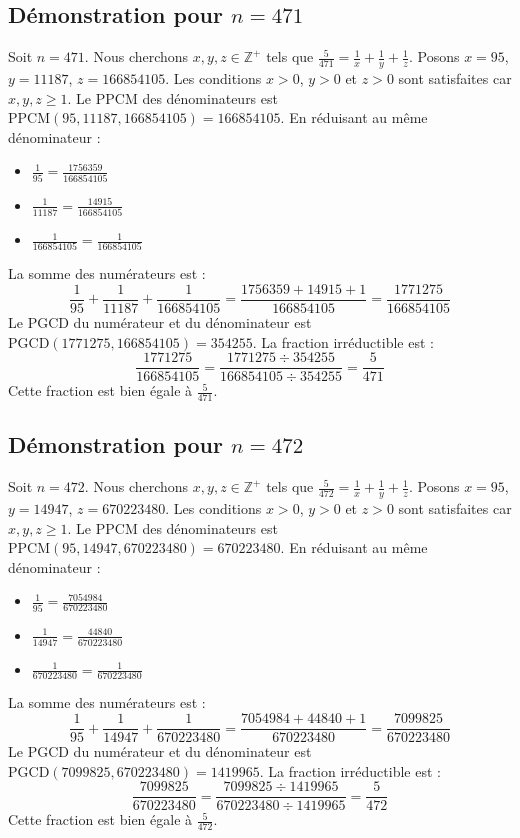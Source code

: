 \documentclass[11pt,a4paper]{article}
\begin{document}
\subsection{Démonstration pour $n = 471$}
Soit $n = 471$. Nous cherchons $x, y, z \in \mathbb{Z}^{+}$ tels que $\frac{5}{471} = \frac{1}{x} + \frac{1}{y} + \frac{1}{z}$.
Posons $x = 95$, $y = 11187$, $z = 166854105$.
Les conditions $x > 0$, $y > 0$ et $z > 0$ sont satisfaites car $x, y, z \geq 1$.
Le PPCM des dénominateurs est $\text{PPCM}(95, 11187, 166854105) = 166854105$.
En réduisant au même dénominateur :
\begin{itemize}
    \item $\frac{1}{95} = \frac{1756359}{166854105}$
    \item $\frac{1}{11187} = \frac{14915}{166854105}$
    \item $\frac{1}{166854105} = \frac{1}{166854105}$
\end{itemize}
La somme des numérateurs est :
$$ \frac{1}{95} + \frac{1}{11187} + \frac{1}{166854105} = \frac{1756359 + 14915 + 1}{166854105} = \frac{1771275}{166854105} $$
Le PGCD du numérateur et du dénominateur est $\text{PGCD}(1771275, 166854105) = 354255$.
La fraction irréductible est :
$$ \frac{1771275}{166854105} = \frac{1771275 \div 354255}{166854105 \div 354255} = \frac{5}{471} $$
Cette fraction est bien égale à $\frac{5}{471}$.

\subsection{Démonstration pour $n = 472$}
Soit $n = 472$. Nous cherchons $x, y, z \in \mathbb{Z}^{+}$ tels que $\frac{5}{472} = \frac{1}{x} + \frac{1}{y} + \frac{1}{z}$.
Posons $x = 95$, $y = 14947$, $z = 670223480$.
Les conditions $x > 0$, $y > 0$ et $z > 0$ sont satisfaites car $x, y, z \geq 1$.
Le PPCM des dénominateurs est $\text{PPCM}(95, 14947, 670223480) = 670223480$.
En réduisant au même dénominateur :
\begin{itemize}
    \item $\frac{1}{95} = \frac{7054984}{670223480}$
    \item $\frac{1}{14947} = \frac{44840}{670223480}$
    \item $\frac{1}{670223480} = \frac{1}{670223480}$
\end{itemize}
La somme des numérateurs est :
$$ \frac{1}{95} + \frac{1}{14947} + \frac{1}{670223480} = \frac{7054984 + 44840 + 1}{670223480} = \frac{7099825}{670223480} $$
Le PGCD du numérateur et du dénominateur est $\text{PGCD}(7099825, 670223480) = 1419965$.
La fraction irréductible est :
$$ \frac{7099825}{670223480} = \frac{7099825 \div 1419965}{670223480 \div 1419965} = \frac{5}{472} $$
Cette fraction est bien égale à $\frac{5}{472}$.
\end{document}
